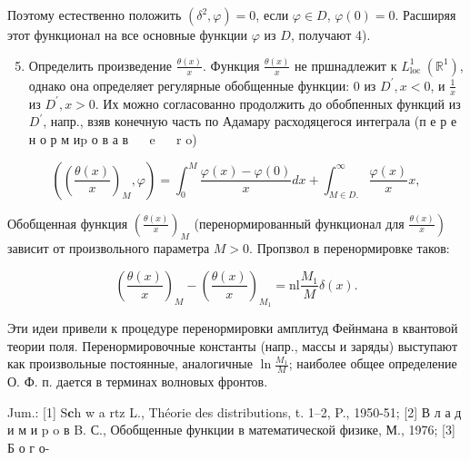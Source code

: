 \documentclass[10pt]{article}
\begin{document}
Поэтому естественно положить $\left(\delta^{2}, \varphi\right)=0$, если $\varphi \in D$, $\varphi(0)=0$. Расширяя этот функционал на все основные функции $\varphi$ из $D$, получают 4).



\begin{enumerate}

  \setcounter{enumi}{4}

  \item Определить произведение $\frac{\theta(x)}{x}$. Функция $\frac{\theta(x)}{x}$ не пршнадлежит к $L_{\text {loc }}^{1}\left(\mathbb{R}^{1}\right)$, однако она определяет регулярные обобщенные функции: 0 из $D^{\prime}, x<0$, и $\frac{1}{x}$ из $D^{\prime}, x>0$. Их можно согласованно продолжить до обобпенных функций из $D^{\prime}$, напр., взяв конечную часть по Адамару расходяцегося интеграла (п е р е н о р м иp о в а в $\quad$ e $\quad$ r o)

\end{enumerate}



\[

\left(\left(\frac{\theta(x)}{x}\right)_{M}, \varphi\right)=\int_{0}^{M} \frac{\varphi(x)-\varphi(0)}{x} d x+\int_{M \in D .}^{\infty} \frac{\varphi(x)}{x} x,

\]



Обобщенная функция $\left(\frac{\theta(x)}{x}\right)_{M}$ (перенормированный функционал для $\left.\frac{\theta(x)}{x}\right)$ зависит от произвольного параметра $M>0$. Пропзвол в перенормировке таков:



\[

\left(\frac{\theta(x)}{x}\right)_{M}-\left(\frac{\theta(x)}{x}\right)_{M_{1}}=\mathrm{nl} \frac{M_{1}}{M} \delta(x) .

\]



Эти идеи привели к процедуре перенормировки амплитуд Фейнмана в квантовой теории поля. Перенормировочные константы (напр., массы и заряды) выступают как произвольные постоянные, аналогичные $\ln \frac{M_{1}}{M}$; наиболее общее определение О. Ф. п. дается в терминах волновых фронтов.



Jum.: [1] $\mathrm{S} \mathbf{c} \mathrm{h}$ w a $\mathrm{r} \mathrm{t} \mathrm{z}$ L., Théorie des distributions, t. 1--2, P., 1950-51; [2] В л а д и м и p o в B. С., Обобщенные функции в математической физике, М., 1976; [3] Б о г о-
\end{document}
